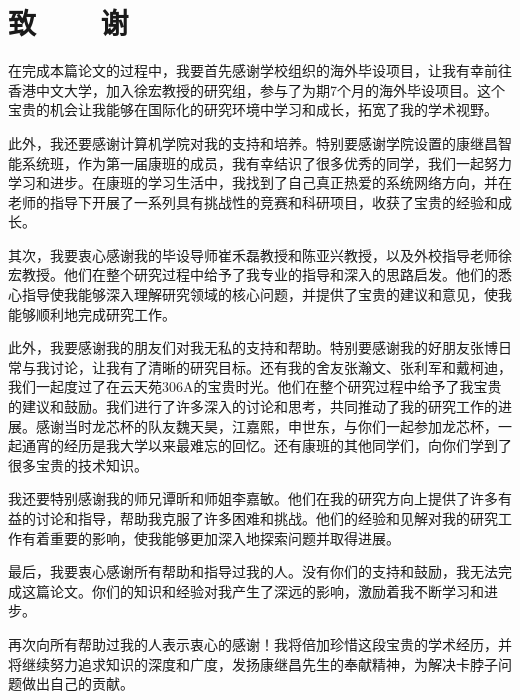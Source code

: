 ﻿\renewcommand{\baselinestretch}{1.5}
\fontsize{12pt}{13pt}\selectfont
{}
\chapter*{致~~~~谢}


在完成本篇论文的过程中，我要首先感谢学校组织的海外毕设项目，让我有幸前往香港中文大学，加入徐宏教授的研究组，参与了为期7个月的海外毕设项目。这个宝贵的机会让我能够在国际化的研究环境中学习和成长，拓宽了我的学术视野。

此外，我还要感谢计算机学院对我的支持和培养。特别要感谢学院设置的康继昌智能系统班，作为第一届康班的成员，我有幸结识了很多优秀的同学，我们一起努力学习和进步。在康班的学习生活中，我找到了自己真正热爱的系统网络方向，并在老师的指导下开展了一系列具有挑战性的竞赛和科研项目，收获了宝贵的经验和成长。

其次，我要衷心感谢我的毕设导师崔禾磊教授和陈亚兴教授，以及外校指导老师徐宏教授。他们在整个研究过程中给予了我专业的指导和深入的思路启发。他们的悉心指导使我能够深入理解研究领域的核心问题，并提供了宝贵的建议和意见，使我能够顺利地完成研究工作。

此外，我要感谢我的朋友们对我无私的支持和帮助。特别要感谢我的好朋友张博日常与我讨论，让我有了清晰的研究目标。还有我的舍友张瀚文、张利军和戴柯迪，我们一起度过了在云天苑306A的宝贵时光。他们在整个研究过程中给予了我宝贵的建议和鼓励。我们进行了许多深入的讨论和思考，共同推动了我的研究工作的进展。感谢当时龙芯杯的队友魏天昊，江嘉熙，申世东，与你们一起参加龙芯杯，一起通宵的经历是我大学以来最难忘的回忆。还有康班的其他同学们，向你们学到了很多宝贵的技术知识。

我还要特别感谢我的师兄谭昕和师姐李嘉敏。他们在我的研究方向上提供了许多有益的讨论和指导，帮助我克服了许多困难和挑战。他们的经验和见解对我的研究工作有着重要的影响，使我能够更加深入地探索问题并取得进展。

最后，我要衷心感谢所有帮助和指导过我的人。没有你们的支持和鼓励，我无法完成这篇论文。你们的知识和经验对我产生了深远的影响，激励着我不断学习和进步。

再次向所有帮助过我的人表示衷心的感谢！我将倍加珍惜这段宝贵的学术经历，并将继续努力追求知识的深度和广度，发扬康继昌先生的奉献精神，为解决卡脖子问题做出自己的贡献。

\clearpage
\endinput